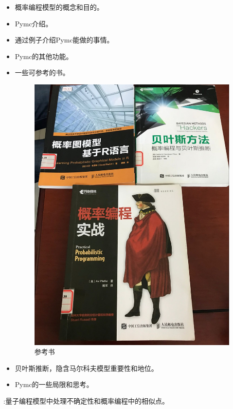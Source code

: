 \begin{itemize}
\begin{itemize}
        \item 概率编程模型的概念和目的。
        \item Pymc介绍。
        \item 通过例子介绍Pymc能做的事情。
        \item Pymc的其他功能。
        \item 一些可参考的书。
            \begin{figure}[h]
                \includegraphics[scale=0.2]{pic/books}
                \caption{参考书}
            \end{figure}
        \item 贝叶斯推断，隐含马尔科夫模型重要性和地位。
        \item Pymc的一些局限和思考。
    \end{itemize}
:量子编程模型中处理不确定性和概率编程中的相似点。

\end{itemize}

